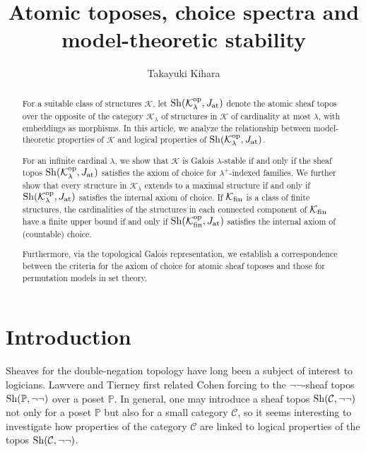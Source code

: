\documentclass[10pt]{amsart}
\title{Atomic toposes, choice spectra and model-theoretic stability}
\author{Takayuki Kihara}
\numberwithin{equation}{section}
\theoremstyle{plain}
\theoremstyle{definition}
\newcommand{\C}{\mathcal{C}}
\newcommand{\K}{\mathcal{K}}
\begin{document}
\maketitle

\begin{abstract}
For a suitable class of structures $\K$, let ${\rm Sh}(\K_\lambda^{\rm op},J_{\rm at})$ denote the atomic sheaf topos over the opposite of the category $\K_\lambda$ of structures in $\K$ of cardinality at most $\lambda$, with embeddings as morphisms.
In this article, we analyze the relationship between model-theoretic properties of $\K$ and logical properties of ${\rm Sh}(\K_\lambda^{\rm op},J_{\rm at})$.

For an infinite cardinal $\lambda$, we show that $\K$ is Galois $\lambda$-stable if and only if the sheaf topos ${\rm Sh}(\K_\lambda^{\rm op},J_{\rm at})$ satisfies the axiom of choice for $\lambda^+$-indexed families.
We further show that every structure in $\K_\lambda$ extends to a maximal structure if and only if ${\rm Sh}(\K_\lambda^{\rm op},J_{\rm at})$ satisfies the internal axiom of choice.
If $\K_{\rm fin}$ is a class of finite structures, the cardinalities of the structures in each connected component of $\K_{\rm fin}$ have a finite upper bound if and only if ${\rm Sh}(\K^{\rm op}_{\rm fin},J_{\rm at})$ satisfies the internal axiom of (countable) choice.

Furthermore, via the topological Galois representation, we establish a correspondence between the criteria for the axiom of choice for atomic sheaf toposes and those for permutation models in set theory.
\end{abstract}

\section{Introduction}\label{sec:Introduction}
Sheaves for the double-negation topology have long been a subject of interest to logicians.
Lawvere \cite{Law71} and Tierney \cite{Tie72} first related Cohen forcing to the $\neg\neg$-sheaf topos ${\rm Sh}(\mathbb{P},\neg\neg)$ over a poset $\mathbb{P}$.
In general, one may introduce a sheaf topos ${\rm Sh}(\C,\neg\neg)$ not only for a poset $\mathbb{P}$ but also for a small category $\C$, so it seems interesting to investigate how properties of the category $\C$ are linked to logical properties of the topos ${\rm Sh}(\C,\neg\neg)$.
\end{document}
